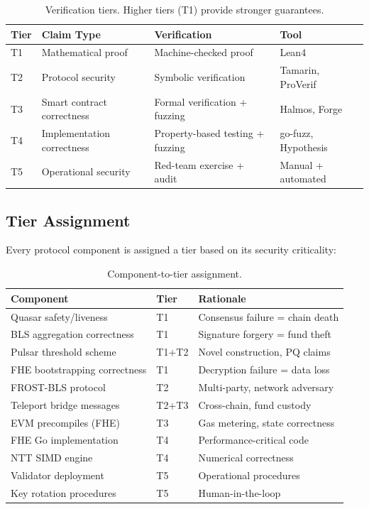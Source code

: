 \documentclass[11pt]{article}
\begin{document}
\begin{table}[h]
\centering
\small
\begin{tabular}{@{}llll@{}}
\toprule
\textbf{Tier} & \textbf{Claim Type} & \textbf{Verification} & \textbf{Tool} \\
\midrule
T1 & Mathematical proof & Machine-checked proof & Lean4 \\
T2 & Protocol security & Symbolic verification & Tamarin, ProVerif \\
T3 & Smart contract correctness & Formal verification + fuzzing & Halmos, Forge \\
T4 & Implementation correctness & Property-based testing + fuzzing & go-fuzz, Hypothesis \\
T5 & Operational security & Red-team exercise + audit & Manual + automated \\
\bottomrule
\end{tabular}
\caption{Verification tiers. Higher tiers (T1) provide stronger guarantees.}
\label{tab:tiers}
\end{table}

\subsection{Tier Assignment}

Every protocol component is assigned a tier based on its security criticality:

\begin{table}[h]
\centering
\small
\begin{tabular}{@{}lll@{}}
\toprule
\textbf{Component} & \textbf{Tier} & \textbf{Rationale} \\
\midrule
Quasar safety/liveness & T1 & Consensus failure = chain death \\
BLS aggregation correctness & T1 & Signature forgery = fund theft \\
Pulsar threshold scheme & T1+T2 & Novel construction, PQ claims \\
FHE bootstrapping correctness & T1 & Decryption failure = data loss \\
FROST-BLS protocol & T2 & Multi-party, network adversary \\
Teleport bridge messages & T2+T3 & Cross-chain, fund custody \\
EVM precompiles (FHE) & T3 & Gas metering, state correctness \\
FHE Go implementation & T4 & Performance-critical code \\
NTT SIMD engine & T4 & Numerical correctness \\
Validator deployment & T5 & Operational procedures \\
Key rotation procedures & T5 & Human-in-the-loop \\
\bottomrule
\end{tabular}
\caption{Component-to-tier assignment.}
\label{tab:assignment}
\end{table}
\end{document}
